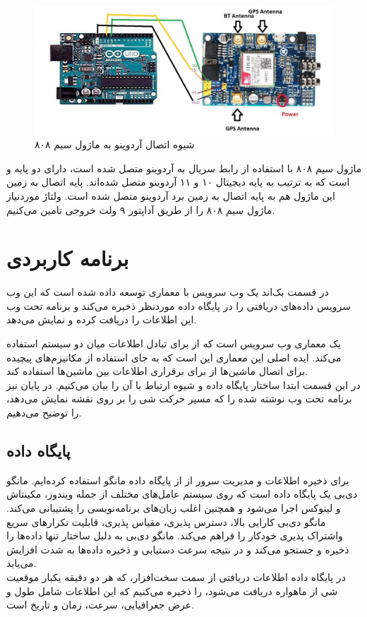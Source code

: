 \begin{figure}[!h]
	\centerline{\includegraphics[width=.8\textwidth]{sim808-arduino}}
	\caption{شیوه اتصال آردوینو به ماژول سیم ۸۰۸\cite{interface}}
\end{figure}


ماژول سیم ۸۰۸ با استفاده از رابط سریال به آردوینو متصل شده است، دارای دو پایه  و  است که به ترتیب به پایه دیجیتال ۱۰ و ۱۱ آردوینو متصل شده‌اند. پایه اتصال به زمین این ماژول هم به پایه اتصال به زمین برد آردوینو متصل شده است. ولتاژ موردنیاز ماژول سیم ۸۰۸ را از طریق آداپتور ۹ ولت خروجی تامین می‌کنیم. 
\section{برنامه کاربردی}
در قسمت بک‌اند یک وب سرویس با معماری  توسعه داده شده است که این وب سرویس داده‌های دریافتی را در پایگاه داده موردنظر ذخیره می‌کند و برنامه تحت وب این اطلاعات را دریافت کرده و نمایش می‌دهد.


یک معماری وب سرویس است که از  برای تبادل اطلاعات میان دو سیستم استفاده می‌کند. ایده اصلی این معماری این است که به جای استفاده از مکانیزم‌های پیچیده برای اتصال ماشین‌ها از  برای برقراری اطلاعات بین ماشین‌ها استفاده کند.\\
در این قسمت ابتدا ساختار پایگاه داده و شیوه ارتباط با آن را بیان می‌کنیم. در پایان نیز برنامه تحت وب نوشته شده را که مسیر حرکت شی را بر روی نقشه نمایش می‌دهد، را توضیح می‌دهیم.
\subsection{پایگاه داده}
برای ذخیره اطلاعات و مدیریت سرور از از پایگاه داده مانگو استفاده کرده‌ایم. مانگو دی‌بی یک پایگاه داده  است که روی سیستم عامل‌های مختلف از جمله ویندوز، مکینتاش و لینوکس اجرا می‌شود و همچنین اغلب زبان‌های برنامه‌نویسی را پشتیبانی می‌کند. مانگو دی‌بی کارایی بالا، دسترس پذیری، مقیاس پذیری، قابلیت تکرارهای سریع واشتراک پذیری خودکار را فراهم می‌کند. مانگو دی‌بی به دلیل ساختار  تنها داده‌ها را ذخیره و جستجو می‌کند و در نتیجه سرعت دستیابی و ذخیره داده‌ها به شدت افزایش می‌یابد.
\\
در پایگاه داده اطلاعات دریافتی از سمت سخت‌افزار، که هر دو دقیقه یکبار موقعیت شی از ماهواره دریافت می‌شود، را ذخیره می‌کنیم که این اطلاعات شامل طول و عرض جغرافیایی، سرعت، زمان و تاریخ است.
